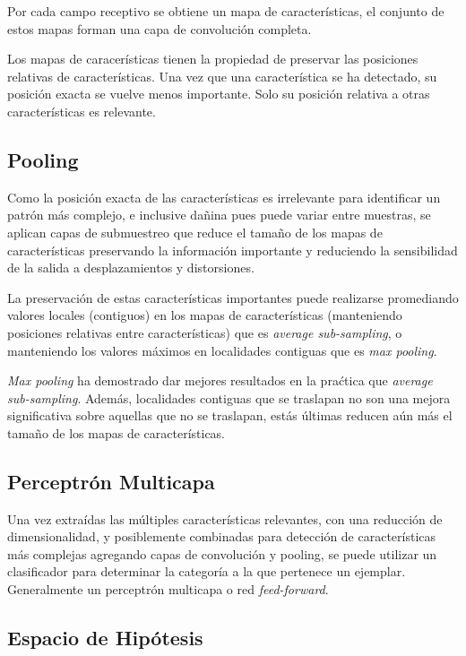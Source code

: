 \documentclass[spanish,11pt,letterpaper]{article}
\begin{document}
Por cada campo receptivo se obtiene un mapa de características, el conjunto de
estos mapas forman una capa de convolución completa.

Los mapas de caracerísticas tienen la propiedad de preservar las posiciones
relativas de características. Una vez que una característica se ha detectado,
su posición exacta se vuelve menos importante. Solo su posición relativa a otras
características es relevante.

\subsection{Pooling}

Como la posición exacta de las características es irrelevante para identificar
un patrón más complejo, e inclusive dañina pues puede variar entre muestras, se
aplican capas de submuestreo que reduce el tamaño de los mapas de características
preservando la información importante y reduciendo la sensibilidad de la salida
a desplazamientos y distorsiones.

La preservación de estas características importantes puede realizarse promediando
valores locales (contiguos) en los mapas de características (manteniendo posiciones
relativas entre características) que es \textit{average sub-sampling}, o manteniendo
los valores máximos en localidades contiguas que es \textit{max pooling}.

\textit{Max pooling} ha demostrado dar mejores resultados en la praćtica que
\textit{average sub-sampling}\cite{pooling}. Además, localidades contiguas que se traslapan
no son una mejora significativa sobre aquellas que no se traslapan, estás
últimas reducen aún más el tamaño de los mapas de características.

\subsection{Perceptrón Multicapa}

Una vez extraídas las múltiples características relevantes, con una reducción
de dimensionalidad, y posiblemente combinadas para detección de características
más complejas agregando capas de convolución y pooling, se puede utilizar un
clasificador para determinar la categoría a la que pertenece un ejemplar.
Generalmente un perceptrón multicapa o red \textit{feed-forward}.

\subsection{Espacio de Hipótesis}
\end{document}

